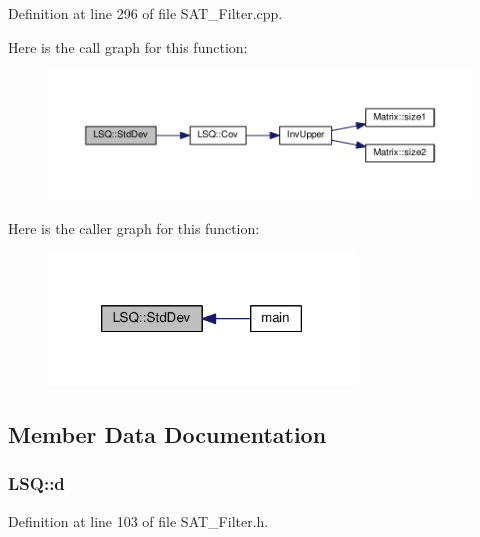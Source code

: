 Definition at line 296 of file S\-A\-T\-\_\-\-Filter.\-cpp.



Here is the call graph for this function\-:\nopagebreak
\begin{figure}[H]
\begin{center}
\leavevmode
\includegraphics[width=350pt]{classLSQ_a735f9e8d4c4028b1e49e00ef0da87f97_cgraph}
\end{center}
\end{figure}




Here is the caller graph for this function\-:\nopagebreak
\begin{figure}[H]
\begin{center}
\leavevmode
\includegraphics[width=230pt]{classLSQ_a735f9e8d4c4028b1e49e00ef0da87f97_icgraph}
\end{center}
\end{figure}




\subsection{Member Data Documentation}
\hypertarget{classLSQ_afcd4314d9ae8c8cf6d7de13bf5f62caa}{
\subsubsection[{d}]{ L\-S\-Q\-::d\hspace{0.3cm}{\ttfamily [private]}}}\label{classLSQ_afcd4314d9ae8c8cf6d7de13bf5f62caa}


Definition at line 103 of file S\-A\-T\-\_\-\-Filter.\-h.

